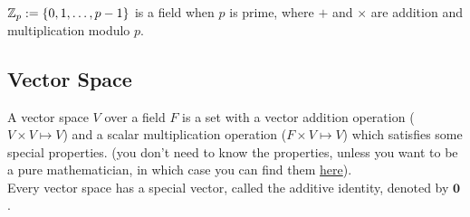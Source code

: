 \documentclass[a4paper,12pt,fleqn]{article}
\newcommand*{\thmdepurl}[1]{https://sharmaeklavya2.github.io/theoremdep/nodes#1}
\newcommand*{\thmdephref}[2]{\href{\thmdepurl{#1}}{#2}}
\newcommand*{\zerovec}{\mathbf{0}}
\begin{document}
\begin{theorem}[DWAP]
$\mathbb{Z}_p := \{0, 1, \ldots, p-1\}$ is a field when $p$ is prime,
where $+$ and $\times$ are addition and multiplication modulo $p$.
\end{theorem}

\subsection{Vector Space}

\begin{definition}
A vector space $V$ over a field $F$ is a set with
a vector addition operation ($V \times V \mapsto V$)
and a scalar multiplication operation ($F \times V \mapsto V$)
which satisfies some special properties.
(you don't need to know the properties, unless you want to be a pure mathematician,
in which case you can find them \thmdephref{/linear-algebra/vector-spaces/vector-space.html}{here}).
\\ Every vector space has a special vector, called the additive identity, denoted by $\zerovec$.
\begin{comment}
\begin{itemize}
\item Properties of $+$:
\begin{itemize}
\item \textbf{Additive closure}: $\forall x \in V, \forall y \in V, x + y \in V$.
\item \textbf{Associativity}: $\forall x,y,z \in V, (x+y)+z = x+(y+z)$.
\item \textbf{Commutativity}: For each $x, y \in V$, $x + y = y + x$.
\item \textbf{Identity}: There exists a special vector in $V$,
    denoted as $\zerovec$, called the \emph{additive identity} of $V$,
    such that $\forall x \in V$, $x + \zerovec = x$.
    (It can be proved that the additive identity is unique.)
\item \textbf{Inverse}: For each $x \in V$, there exists another vector in $V$,
    denoted as $-x$, called the \emph{additive inverse} of $x$,
    such that $x + (-x) = \zerovec$.
    (It can be proved that for a given $x$, the additive inverse is unique.)
\end{itemize}
\item Properties of scalar multiplication:
\begin{itemize}
\item \textbf{Associativity}: $\forall a \in F, \forall b \in F, \forall x \in V, a(bx) = (ab)x$.

\end{comment}
\end{definition}
\end{document}
